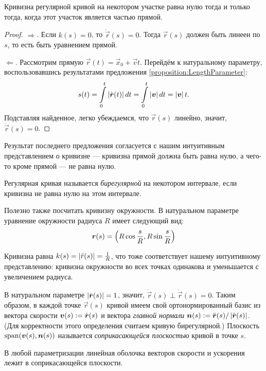 \begin{proposition}
	Кривизна регулярной кривой на некотором участке равна нулю тогда и только тогда, когда этот участок является частью прямой.
\end{proposition}

\begin{proof}
	$\Rightarrow$. Если $k(s) = 0$, то $\ddot{\vec{r}}(s) = 0$. Тогда $\vec{r}(s)$ должен быть линеен по $s$, то есть быть уравнением прямой.

	$\Leftarrow$. Рассмотрим прямую $\vec{r}(t) = \vec{x}_0 + \vec{v}t$. Перейдём к натуральному параметру, воспользовавшись результатами предложения \ref{proposition:LengthParameter}:
	\[
		s(t) = \int\limits_0^t\abs{\dot{\vec{r}}(t)}dt = \int\limits_0^t \abs{\vec{v}}dt = \abs{\vec{v}}t.
	\]
	Подставляя найденное, легко убеждаемся, что $\vec{r}(s)$ линейно, значит, $\ddot{\vec{r}}(s) = 0$.
\end{proof}

Результат последнего предложения согласуется с нашим интуитивным представлением о кривизне --- кривизна прямой должна быть равна нулю, а чего-то кроме прямой --- не равна нулю.

\begin{definition}
	Регулярная кривая называется \textit{бирегулярной} на некотором интервале, если кривизна не равна нулю на этом интервале.
\end{definition}

Полезно также посчитать кривизну окружности. В натуральном параметре уравнение окружности радиуса $R$ имеет следующий вид:
\[
	\vec{r}(s) = \br{R\cos\frac{s}{R}, R\sin\frac{s}{R}}
\]

Кривизна равна $k(s) = \abs{\ddot{r}(s)} = \frac{1}{R}$, что тоже соответствует нашему интуитивному представлению: кривизна окружности во всех точках одинакова и уменьшается с увеличением радиуса.

В натуральном параметре $\abs{\dot{\vec{r}}(s)} = 1$, значит, $\dot{\vec{r}}(s) \perp \ddot{\vec{r}}(s) = 0$. Таким образом, в каждой точке $\vec{r}(s)$ кривой имеем свой ортонормированный базис из вектора скорости $\vec{v}(s) \vcentcolon = \dot{\vec{r}}(s)$ и вектора \textit{главной нормали} $\vec{n}(s) \vcentcolon = \ddot{\vec{r}}(s) / \abs{\ddot{\vec{r}}(s)}$. (Для корректности этого определения считаем кривую бирегулярной.) Плоскость $\span(\vec{v}(s), \vec{n}(s))$ называется \textit{соприкасающейся плоскостью} кривой в точке $s$.

\begin{proposition} \label{proposition:TouchPlane}
	В любой параметризации линейная оболочка векторов скорости и ускорения лежит в соприкасающейся плоскости.
\end{proposition}

